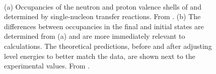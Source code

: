 \begin{figure}[!htbp]
\centering
{}
\\
\caption{(a) Occupancies of the neutron and proton valence shells of  and  determined by single-nucleon transfer reactions.  From \citep{schiffer_review}.  (b)  The differences between occupancies in the final and initial states are determined from (a) and are more immediately relevant to \NME calculations.  The theoretical predictions, before and after adjusting level energies to better match the data, are shown next to the experimental values.  From \citep{schiffer_review}.}
\label{fig:occupancyDiffs}
\end{figure}

